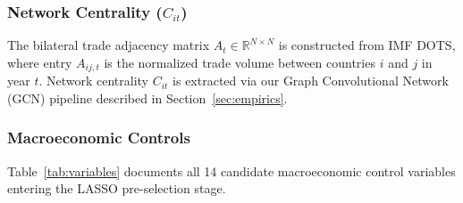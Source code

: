 \documentclass[12pt, letterpaper]{article}
\theoremstyle{definition}
\begin{document}
\subsubsection{Network Centrality \texorpdfstring{($C_{it}$)}{(C\_it)}}

The bilateral trade adjacency matrix $A_{t} \in \mathbb{R}^{N \times N}$ is constructed from IMF DOTS, where entry $A_{ij,t}$ is the normalized trade volume between countries $i$ and $j$ in year $t$. Network centrality $C_{it}$ is extracted via our Graph Convolutional Network (GCN) pipeline described in Section~\ref{sec:empirics}.

\subsubsection{Macroeconomic Controls}

Table~\ref{tab:variables} documents all 14 candidate macroeconomic control variables entering the LASSO pre-selection stage.
\end{document}
